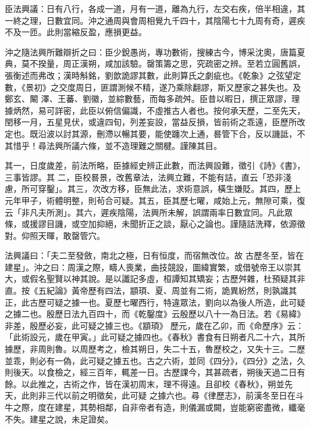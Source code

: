 \begin{pinyinscope}
 臣法興議：日有八行，各成一道，月有一道，離為九行，左交右疾，倍半相違，其
 一終之理，日數宜同。沖之通周與會周相覺九千四十，其陰陽七十九周有奇，遲疾不及一匝。此則當縮反盈，應損更益。



 沖之隨法興所難辯折之曰：臣少銳愚尚，專功數術，搜練古今，博采沈奧，唐篇夏典，莫不揆量，周正漢朔，咸加該驗。罄策籌之思，究疏密之辨。至若立圓舊誤，張衡述而弗改；漢時斛銘，劉歆詭謬其數，此則算氏之劇疵也。《乾象》之弦望定數，《景初》之交度周日，匪謂測候不精，遂乃乘除翻謬，斯又歷家之甚失也。及鄭玄、闞
 澤、王蕃、劉徽，並綜數藝，而每多疏舛。臣昔以暇日，撰正眾謬，理據炳然，易可詳密，此臣以俯信偏識，不虛推古人者也。按何承天歷，二至先天，閏移一月，五星見伏，或違四旬，列差妄設，當益反損，皆前術之乖遠，臣歷所改定也。既沿波以討其源，刪滯以暢其要，能使躔次上通，晷管下合，反以譏詆，不其惜乎！尋法興所議六條，並不造理難之關楗。謹陳其目。



 其一，日度歲差，前法所略，臣據經史辨正此數，而法興設難，徵引《詩》《書》，三事皆謬。其
 二，臣校晷景，改舊章法，法興立難，不能有詰，直云「恐非淺慮，所可穿鑿」。其三，次改方移，臣無此法，求術意誤，橫生嫌貶。其四，歷上元年甲子，術體明整，則茍合可疑。其五，臣其歷七曜，咸始上元，無隙可乘，復云「非凡夫所測」。其六，遲疾陰陽，法興所未解，誤謂兩率日數宜同。凡此眾條，或援謬目譏，或空加抑絕，未聞折正之談，厭心之論也。謹隨詰洗釋，依源徵對。仰照天暉，敢罄管穴。



 法興議曰：「夫二至發斂，南北之極，日有恒度，而宿無改位。故
 古歷冬至，皆在建星」。沖之曰：周漢之際，疇人喪業，曲技競設，圖緯實繁，或借號帝王以崇其大，或假名聖賢以神其說。是以讖記多虛，桓譚知其矯妄；古歷舛雜，杜預疑其非直。按《五紀論》黃帝歷有四法，顓頊、夏、周並有二術，詭異紛然，則孰識其正，此古歷可疑之據一也。夏歷七曜西行，特違眾法，劉向以為後人所造，此可疑之據二也。殷歷日法九百四十，而《乾鑿度》云殷歷以八十一為日法。若《易緯》非差，殷歷必妄，此可疑之據三也。《顓頊》
 歷元，歲在乙卯，而《命歷序》云：「此術設元，歲在甲寅。」此可疑之據四也。《春秋》書食有日朔者凡二十六，其所據歷，非周則魯。以周歷考之，檢其朔日，失二十五，魯歷校之，又失十三。二歷並乖，則必有一偽，此可疑之據五也。古之六術，並同《四分》，《四分》之法，久則後天。以食檢之，經三百年，輒差一日。古歷課今，其甚疏者，朔後天過二日有餘。以此推之，古術之作，皆在漢初周末，理不得遠。且卻校《春秋》，朔並先天，此則非三代以前之明徵矣，此可疑
 之據六也。尋《律歷志》，前漢冬至日在斗牛之際，度在建星，其勢相鄰，自非帝者有造，則儀漏或闕，豈能窮密盡微，纖毫不失。建星之說，未足證矣。




\end{pinyinscope}
